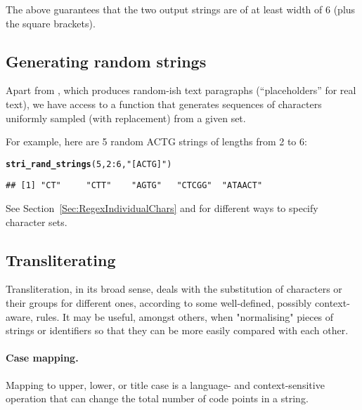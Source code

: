 \documentclass[nojss]{jss}\usepackage[]{graphicx}\usepackage[]{xcolor}
\makeatletter
\newcommand{\hlnum}[1]{\textcolor[rgb]{0.686,0.059,0.569}{#1}}%
\newcommand{\hlstr}[1]{\textcolor[rgb]{0.192,0.494,0.8}{#1}}%
\newcommand{\hlopt}[1]{\textcolor[rgb]{0,0,0}{#1}}%
\newcommand{\hlstd}[1]{\textcolor[rgb]{0.345,0.345,0.345}{#1}}%
\newcommand{\hlkwd}[1]{\textcolor[rgb]{0.737,0.353,0.396}{\textbf{#1}}}%
\newenvironment{kframe}{%
 \def\at@end@of@kframe{}%
 \ifinner\ifhmode%
  \def\at@end@of@kframe{\end{minipage}}%
  \begin{minipage}{\columnwidth}%
 \fi\fi%
 \def\FrameCommand##1{\hskip\@totalleftmargin \hskip-\fboxsep
 \colorbox{shadecolor}{##1}\hskip-\fboxsep
     \hskip-\linewidth \hskip-\@totalleftmargin \hskip\columnwidth}%
 \MakeFramed {\advance\hsize-\width
   \@totalleftmargin\z@ \linewidth\hsize
   \@setminipage}}%
 {\par\unskip\endMakeFramed%
 \at@end@of@kframe}
\newenvironment{knitrout}{}{} %
\makeatother
\begin{document}
The above guarantees that the two output strings are
of at least width of 6 (plus the square brackets).



\subsection{Generating random strings}

Apart from ,
which produces random-ish text paragraphs (``placeholders'' for real text),
we have access to a function that generates sequences of characters
uniformly sampled (with replacement) from a given set.

For example, here are 5 random ACTG strings of lengths from 2 to 6:

\begin{knitrout}
\color{fgcolor}\begin{kframe}
\begin{alltt}
\hlkwd{stri_rand_strings}\hlstd{(}\hlnum{5}\hlstd{,} \hlnum{2}\hlopt{:}\hlnum{6}\hlstd{,} \hlstr{"[ACTG]"}\hlstd{)}
\end{alltt}
\begin{verbatim}
## [1] "CT"     "CTT"    "AGTG"   "CTCGG"  "ATAACT"
\end{verbatim}
\end{kframe}
\end{knitrout}



See Section~\ref{Sec:RegexIndividualChars}
and 
for different ways to specify character sets.





\subsection{Transliterating}

Transliteration, in its broad sense, deals with the substitution
of characters or their groups for different ones, according to some
well-defined, possibly context-aware, rules.
It may be useful, amongst others, when "normalising"
pieces of strings or identifiers so that they can be more easily
compared with each other.


\paragraph{Case mapping.}
Mapping to  upper, lower, or title case
is a language- and context-sensitive operation
that can change the total number of code points in a string.
\end{document}
